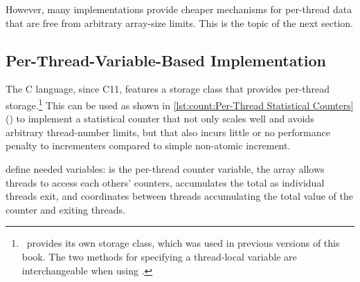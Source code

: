 \QuickQuizLabel{\StatisticalCounterAccuracy}

However, many implementations provide cheaper mechanisms for
per-thread data that are free from arbitrary array-size limits.
This is the topic of the next section.

\subsection{Per-Thread-Variable-Based Implementation}
\label{sec:count:Per-Thread-Variable-Based Implementation}

The C language, since C11, features a  storage class that
provides per-thread storage.\footnote{
	\GCC\ provides its own  storage class, which was used
	in previous versions of this book.
	The two methods for specifying a thread-local variable are
	interchangeable when using \GCC\@.}
This can be used as shown in
\cref{lst:count:Per-Thread Statistical Counters} ()
to implement
a statistical counter that not only scales well and avoids arbitrary
thread-number limits, but that also incurs little or no performance
penalty to incrementers compared to simple non-atomic increment.

\begin{listing}

\caption{Per-Thread Statistical Counters}
\label{lst:count:Per-Thread Statistical Counters}
\end{listing}

\begin{fcvref}
 define needed variables:
 is the per-thread counter
variable, the  array allows threads to access each others'
counters,  accumulates the total as individual threads exit,
and  coordinates between threads accumulating the total
value of the counter and exiting threads.
\end{fcvref}

